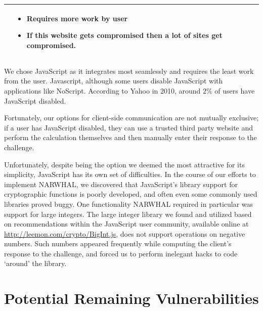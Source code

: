 \documentclass[11pt]{article}
\begin{document}
\begin{center}
\begin{tabular}{|  p{6cm} | p{5cm} | p{5cm} |}
    &

    \begin{itemize}[leftmargin=*]
      \item Requires more work by user
      \item If this website gets compromised then a lot of sites get compromised.
    \end{itemize}
    
    \\ \hline
    
    \end{tabular}
\end{center}

\normalsize

We chose JavaScript as it integrates most seamlessly and requires the least work from the user. Javascript, although some users disable JavaScript with applications like NoScript. According to Yahoo in 2010, around $2\%$ of users have JavaScript disabled. \cite{Zakas}

Fortunately, our options for client-side communication are not mutually exclusive; if a user has JavaScript disabled, they can use a trusted third party website and perform the calculation themselves and then manually enter their response to the challenge.

Unfortunately, despite being the option we deemed the most attractive for its simplicity, JavaScript has its own set of difficulties.  In the course of our efforts to implement NARWHAL, we discovered that JavaScript's library support for cryptographic functions is poorly developed, and often even some commonly used libraries proved buggy.  One functionality NARWHAL required in particular was support for large integers.  The large integer library we found and utilized based on recommendations within the JavaScript user community, available online at \url{http://leemon.com/crypto/BigInt.js}, does not support operations on negative numbers.  Such numbers appeared frequently while computing the client's response to the challenge, and forced us to perform inelegant hacks to code ‘around' the library.


\section{Potential Remaining Vulnerabilities}
\end{document}
